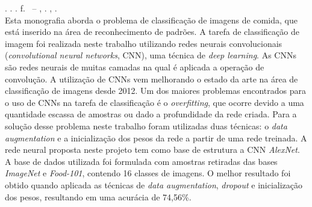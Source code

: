 
\begin{resumo}[RESUMO]
\begin{SingleSpacing}

\imprimirautorcitacao. \imprimirtitulo. \imprimirdata. \pageref {LastPage} f. \imprimirprojeto\ – \imprimirprograma, \imprimirinstituicao. \imprimirlocal, \imprimirdata.\\


Esta monografia aborda o problema de classificação de imagens de comida, que está inserido na área de reconhecimento de padrões. A tarefa de classificação de imagem foi realizada neste trabalho utilizando redes neurais convolucionais (\textit{convolutional neural networks}, CNN), uma técnica de \textit{deep learning}. As CNNs são redes neurais de muitas camadas na qual é aplicada a operação de convolução. A utilização de CNNs vem melhorando o estado da arte na área de classificação de imagens desde 2012. Um dos maiores problemas encontrados para o uso de CNNs na tarefa de classificação é o \textit{overfitting}, que ocorre devido a uma quantidade escassa de amostras ou dado a profundidade da rede criada. Para a solução desse problema neste trabalho foram utilizadas duas técnicas: o \textit{data augmentation} e a inicialização dos pesos da rede a partir de uma rede treinada. A rede neural proposta neste projeto tem como base de estrutura a CNN \textit{AlexNet}. A base de dados utilizada foi formulada com amostras retiradas das bases \textit{ImageNet} e \textit{Food-101}, contendo 16 classes de imagens. O melhor resultado foi obtido quando aplicada as técnicas de \textit{data augmentation}, \textit{dropout} e inicialização dos pesos, resultando em uma acurácia de 74,56\%.





\end{SingleSpacing}
\end{resumo}
